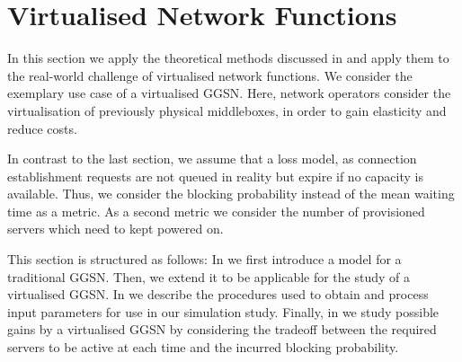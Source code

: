 \section{Virtualised Network Functions}\label{sec:cloud:virtualized_network_functions}
\newcommand{\blockingprobability}[0]{p_B}
\newcommand{\maxServers}[0]{S_{\max}}
In this section we apply the theoretical methods discussed in  and apply them to the real-world challenge of virtualised network functions.
We consider the exemplary use case of a virtualised \gls{GGSN}.
Here, network operators consider the virtualisation of previously physical middleboxes, in order to gain elasticity and reduce costs.

In contrast to the last section, we assume that a loss model, as connection establishment requests are not queued in reality but expire if no capacity is available.
Thus, we consider the blocking probability instead of the mean waiting time as a metric.
As a second metric we consider the number of provisioned servers which need to kept powered on. 

This section is structured as follows:
In  we first introduce a model for a traditional \gls{GGSN}.
Then, we extend it to be applicable for the study of a virtualised \gls{GGSN}.
In  we describe the procedures used to obtain and process input parameters for use in our simulation study.
Finally, in  we study possible gains by a virtualised \gls{GGSN} by considering the tradeoff between the required servers to be active at each time and the incurred blocking probability. 



